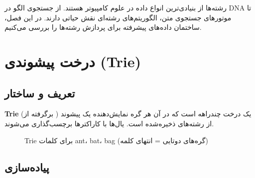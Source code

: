 \documentclass{matinbook}
\begin{document}
    رشته‌ها از بنیادی‌ترین انواع داده
    در علوم کامپیوتر هستند. از جستجوی الگو
    در DNA تا موتورهای جستجوی متن،
    الگوریتم‌های رشته‌ای
    نقش حیاتی دارند. در این فصل،
    ساختمان داده‌های پیشرفته برای
    پردازش رشته‌ها را بررسی می‌کنیم.
    
    \section{درخت پیشوندی (Trie)}
    
    \subsection{تعریف و ساختار}
    
    \begin{definition}[Trie]
        \textbf{Trie}
        (برگرفته از )
        یک درخت چندراهه است که در آن
        هر گره نمایش‌دهنده یک پیشوند
        از رشته‌های ذخیره‌شده است.
        یال‌ها با کاراکترها برچسب‌گذاری می‌شوند.
        \label{def:trie}
    \end{definition}
    
    \begin{figure}[h]
        \centering
        \begin{latin}
        \end{latin}
        \caption{Trie برای کلمات ant، bat، bag (گره‌های دوتایی = انتهای کلمه)}
        \label{fig:trie}
    \end{figure}
    
    \subsection{پیاده‌سازی}
    
\end{document}
